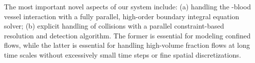 
The most important novel aspects of our system include:
(a) handling the \rbc-blood vessel interaction with a fully parallel, high-order
boundary integral equation solver;
(b) explicit handling of collisions with a parallel constraint-based resolution and detection algorithm.
The former is essential for modeling confined flows, while the latter is essential for handling high-volume fraction flows at long time scales without excessively small time steps or fine spatial discretizations. 

